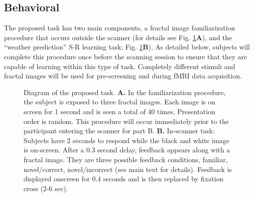 \documentclass[doc]{apa}        %
\begin{document}
\subsection{Behavioral} %
\label{sub:behavioral}
The proposed task has two main components, a fractal image familiarization procedure that occurs outside the scanner (for details see Fig. \ref{fig:taskDia}\textbf{A}), and the ``weather prediction'' S-R learning task; Fig. \ref{fig:taskDia}\textbf{B}), As detailed below, subjects will complete this procedure once before the scanning session to ensure that they are capable of learning within this type of task.  Completely different stimuli and fractal images will be used for pre-screening and during fMRI data acquisition.

\begin{figure}[tp]
\caption{Diagram of the proposed task.  \textbf{A.} In the familiarization procedure, the subject is exposed to three fractal images.  Each image is on screen for 1 second and is seen a total of 40 times.  Presentation order is random.  This procedure will occur immediately prior to the participant entering the scanner for part B.  \textbf{B.} In-scanner task:   Subjects have 2 seconds to respond while the black and white image is on-screen.  After a 0.3 second delay, feedback appears along with a fractal image.  They are three possible feedback conditions, familiar, novel/correct, novel/incorrect (see main text for details). Feedback is displayed onscreen for 0.4 seconds and is then replaced by fixation cross (2-6 sec).}
\label{fig:taskDia}
\end{figure}
\end{document}
